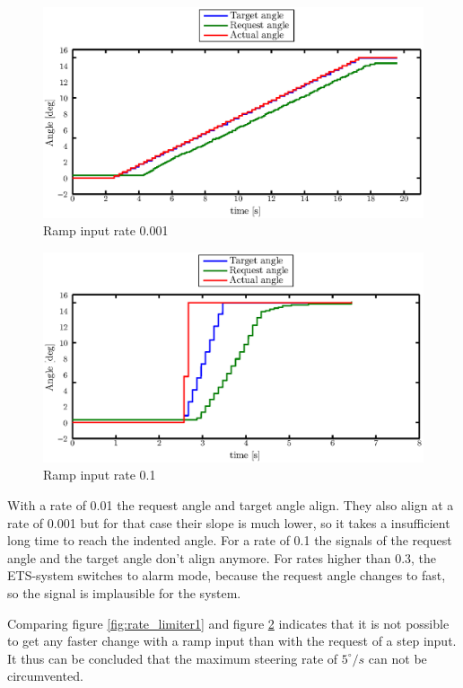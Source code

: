 \documentclass[ExampleMasters.tex]{subfiles}
\begin{document}
\begin{figure}[!hbt]
	\centering
	\includegraphics[width=1\linewidth]{figures/rate_limiter2}
	\caption{Ramp input rate 0.001}
	
	\label{fig:rate_limiter2}
\end{figure}
\begin{figure}[!hbt]
	\centering
	\includegraphics[width=1\linewidth]{figures/rate_limiter3}
	\caption{Ramp input rate 0.1}
	
	\label{fig:rate_limiter3}
\end{figure}

With a rate of 0.01 the request angle and target angle align. They also align at a rate of 0.001 but for that case their slope is much lower, so it takes a insufficient long time to reach the indented angle. For a rate of 0.1 the signals of the request angle and the target angle don't align anymore. For rates higher than 0.3, the \gls{ETS}-system switches to alarm mode, because the request angle changes to fast, so the signal is implausible for the system.   


Comparing figure \ref{fig:rate_limiter1} and figure \ref{fig:rate_limiter3} indicates that it is not possible to get any faster change with a ramp input than with the request of a step input. It thus can be concluded that the maximum steering rate of $5 ^\circ /s$ can not be circumvented.
\end{document}
